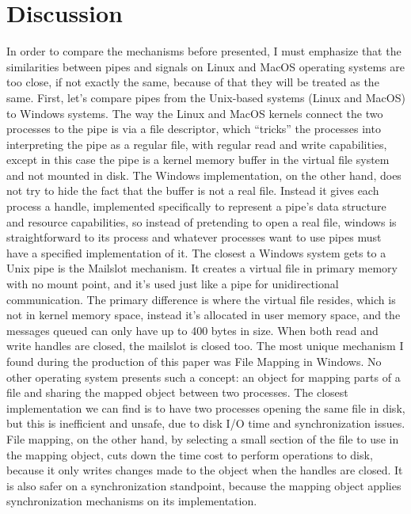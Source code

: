 \documentclass[12pt]{article}
\begin{document}
\section{Discussion}
	In order to compare the mechanisms before presented, I must emphasize that the similarities between pipes and signals on Linux and MacOS operating systems are too close, if not exactly the same, because of that they will be treated as the same. 
	First, let’s compare pipes from the Unix-based systems (Linux and MacOS) to Windows systems. The way the Linux and MacOS kernels connect the two processes to the pipe is via a file descriptor, which “tricks” the processes into interpreting the pipe as a regular file, with regular read and write capabilities, except in this case the pipe is a kernel memory buffer in the virtual file system and not mounted in disk. The Windows implementation, on the other hand, does not try to hide the fact that the buffer is not a real file. Instead it gives each process a handle, implemented specifically to represent a pipe’s data structure and resource capabilities, so instead of pretending to open a real file, windows is straightforward to its process and whatever processes want to use pipes must have a specified implementation of it. 
The closest a Windows system gets to a Unix pipe is the Mailslot mechanism. It creates a virtual file in primary memory with no mount point, and it’s used just like a pipe for unidirectional communication. The primary difference is where the virtual file resides, which is not in kernel memory space, instead it’s allocated in user memory space, and the messages queued can only have up to 400 bytes in size. When both read and write handles are closed, the mailslot is closed too.
The most unique mechanism I found during the production of this paper was File Mapping in Windows. No other operating system presents such a concept: an object for mapping parts of a file and sharing the mapped object between two processes. The closest implementation we can find is to have two processes opening the same file in disk, but this is inefficient and unsafe, due to disk I/O time and synchronization issues. File mapping, on the other hand, by selecting a small section of the file to use in the mapping object, cuts down the time cost to perform operations to disk, because it only writes changes made to the object when the handles are closed. It is also safer on a synchronization standpoint, because the mapping object applies synchronization mechanisms on its implementation.
\end{document}
